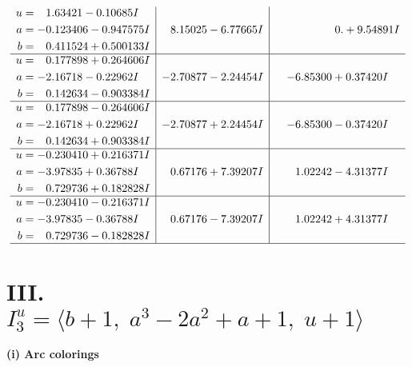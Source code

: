 \documentclass[1p]{elsarticle_modified}
\theoremstyle{definition}
\begin{document}
$$\begin{array}{c|c|c}
\begin{aligned}
u &= \phantom{-}1.63421 - 0.10685 I \\
a &= -0.123406 - 0.947575 I \\
b &= \phantom{-}0.411524 + 0.500133 I\end{aligned}
 & \phantom{-}8.15025 - 6.77665 I & \phantom{-0.000000 -}0. + 9.54891 I \\ \hline\begin{aligned}
u &= \phantom{-}0.177898 + 0.264606 I \\
a &= -2.16718 - 0.22962 I \\
b &= \phantom{-}0.142634 - 0.903384 I\end{aligned}
 & -2.70877 - 2.24454 I & -6.85300 + 0.37420 I \\ \hline\begin{aligned}
u &= \phantom{-}0.177898 - 0.264606 I \\
a &= -2.16718 + 0.22962 I \\
b &= \phantom{-}0.142634 + 0.903384 I\end{aligned}
 & -2.70877 + 2.24454 I & -6.85300 - 0.37420 I \\ \hline\begin{aligned}
u &= -0.230410 + 0.216371 I \\
a &= -3.97835 + 0.36788 I \\
b &= \phantom{-}0.729736 + 0.182828 I\end{aligned}
 & \phantom{-}0.67176 + 7.39207 I & \phantom{-}1.02242 - 4.31377 I \\ \hline\begin{aligned}
u &= -0.230410 - 0.216371 I \\
a &= -3.97835 - 0.36788 I \\
b &= \phantom{-}0.729736 - 0.182828 I\end{aligned}
 & \phantom{-}0.67176 - 7.39207 I & \phantom{-}1.02242 + 4.31377 I\\
 \hline 
 \end{array}$$\newpage\newpage\renewcommand{\arraystretch}{1}
\centering \section*{III. $I^u_{3}= \langle b+1,\;a^3-2 a^2+a+1,\;u+1 \rangle$}
\flushleft \textbf{(i) Arc colorings}\\
\end{document}
